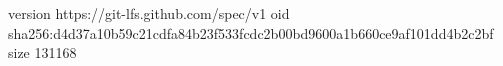 version https://git-lfs.github.com/spec/v1
oid sha256:d4d37a10b59c21cdfa84b23f533fcdc2b00bd9600a1b660ce9af101dd4b2c2bf
size 131168
